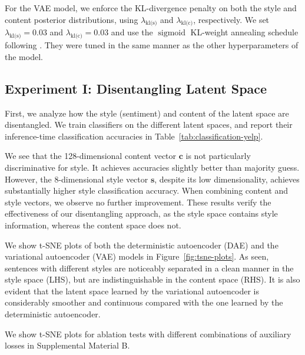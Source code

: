 \documentclass[letterpaper]{article} %
\newcommand{\hyp}[1]{\lambda_{\text{#1}}}
\begin{document}
For the VAE model, we enforce the KL-divergence penalty on both the style and content posterior distributions, using $\hyp{kl(s)}$ and $\hyp{kl(c)}$, respectively.
We set $\hyp{kl(s)} = 0.03$ and $\hyp{kl(c)} = 0.03$ and use the $\operatorname{sigmoid}$ KL-weight annealing schedule following \citet{bahuleyan2018probabilistic}.
They were tuned in the same manner as the other hyperparameters of the model.


\subsection{Experiment I: Disentangling Latent Space}

First, we analyze how the style (sentiment) and content of the latent space are disentangled.
We train classifiers on the different latent spaces, and report their inference-time classification accuracies in Table~\ref{tab:classification-yelp}.

We see that the 128-dimensional content vector $\bm c$ is not particularly discriminative for style.
It achieves accuracies slightly better than majority guess.
However, the 8-dimensional style vector $\bm s$, despite its low dimensionality, achieves substantially higher style classification accuracy.
When combining content and style vectors, we observe no further improvement.
These results verify the effectiveness of our disentangling approach, as the style space contains style information, whereas the content space does not.

We show t-SNE plots of both the deterministic autoencoder (DAE) and the variational autoencoder (VAE) models in Figure~\ref{fig:tsne-plots}.
As seen, sentences with different styles are noticeably separated in a clean manner in the style space (LHS), but are indistinguishable in the content space (RHS).
It is also evident that the latent space learned by the variational autoencoder is considerably smoother and continuous compared with the one learned by the deterministic autoencoder.

We show t-SNE plots for ablation tests with different combinations of auxiliary losses in Supplemental Material B.
\end{document}
